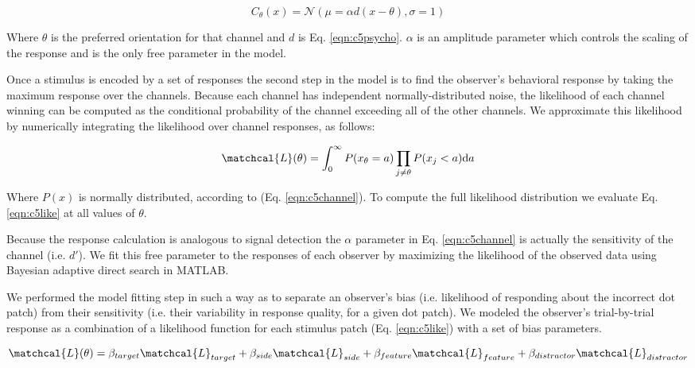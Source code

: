 \begin{equation}
    C_{\theta}(x) = \mathcal{N}(\mu = \alpha d(x-\theta),\sigma=1)
    \label{eqn:c5channel}
\end{equation}

Where $\theta$ is the preferred orientation for that channel and $d$ is Eq. \ref{eqn:c5psycho}. $\alpha$ is an amplitude parameter which controls the scaling of the response and is the only free parameter in the model.

Once a stimulus is encoded by a set of responses the second step in the model is to find the observer's behavioral response by taking the maximum response over the channels. Because each channel has independent normally-distributed noise, the likelihood of each channel winning can be computed as the conditional probability of the channel exceeding all of the other channels. We approximate this likelihood by numerically integrating the likelihood over channel responses, as follows:

\begin{equation}
    \matchcal{L}(\theta) = \int_{0}^{\infty} P(x_{\theta}=a) \prod_{j\neq \theta}P(x_j < a) \mathrm{d}a
    \label{eqn:c5like}
\end{equation}

Where $P(x)$ is normally distributed, according to (Eq. \ref{eqn:c5channel}). To compute the full likelihood distribution we evaluate Eq. \ref{eqn:c5like} at all values of $\theta$.

Because the response calculation is analogous to signal detection the $\alpha$ parameter in Eq. \ref{eqn:c5channel} is actually the sensitivity of the channel (i.e. $d'$). We fit this free parameter to the responses of each observer by maximizing the likelihood of the observed data using Bayesian adaptive direct search \citep{Acerbi2017-xz} in MATLAB.

We performed the model fitting step in such a way as to separate an observer's bias (i.e. likelihood of responding about the incorrect dot patch) from their sensitivity (i.e. their variability in response quality, for a given dot patch). We modeled the observer's trial-by-trial response as a combination of a likelihood function for each stimulus patch (Eq. \ref{eqn:c5like}) with a set of bias parameters.

\begin{equation}
    \matchcal{L}(\theta) = \beta_{target}\matchcal{L}_{target} + \beta_{side}\matchcal{L}_{side} +\beta_{feature}\matchcal{L}_{feature} +\beta_{distractor}\matchcal{L}_{distractor}
\end{equation}

